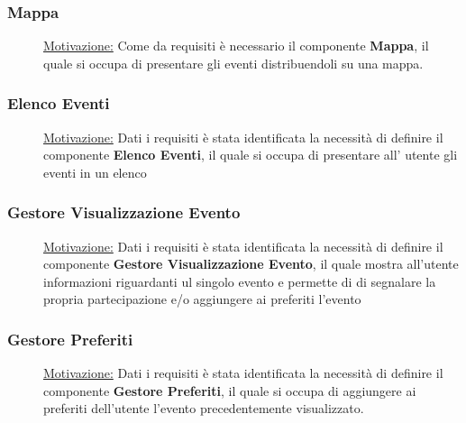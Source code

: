 \documentclass{article}
\begin{document}
\subsubsection{Mappa}
\begin{description}
    \item[] \underline{Motivazione:}
        Come da requisiti è necessario il componente \textbf{Mappa}, il quale si occupa di presentare gli eventi distribuendoli su una mappa.
\end{description}
\subsubsection{Elenco Eventi}
\begin{description}
    \item[] \underline{Motivazione:}
        Dati i requisiti è stata identificata la necessità di definire il componente \textbf{Elenco Eventi}, il quale si occupa di presentare all' utente gli eventi in un elenco
\end{description}
\subsubsection{Gestore Visualizzazione Evento}
\begin{description}
    \item[] \underline{Motivazione:}
        Dati i requisiti è stata identificata la necessità di definire il componente \textbf{Gestore Visualizzazione Evento}, il quale mostra all'utente informazioni riguardanti ul singolo evento e permette di di segnalare la propria partecipazione e/o aggiungere ai preferiti l'evento
\end{description}
\subsubsection{Gestore Preferiti}
\begin{description}
    \item[] \underline{Motivazione:}
        Dati i requisiti è stata identificata la necessità di definire il componente \textbf{Gestore Preferiti}, il quale si occupa di aggiungere ai preferiti dell'utente l'evento precedentemente visualizzato.
\end{description}
\clearpage
\end{document}
